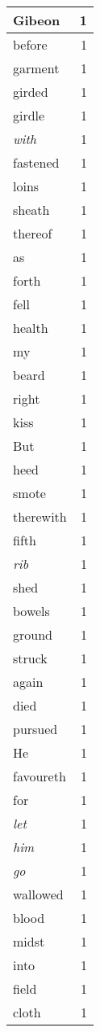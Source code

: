 \begin{center}
\begin{longtable}{l|r}
Gibeon & 1 \\ \hline
before & 1 \\ \hline
garment & 1 \\ \hline
girded & 1 \\ \hline
girdle & 1 \\ \hline
\emph{with} & 1 \\ \hline
fastened & 1 \\ \hline
loins & 1 \\ \hline
sheath & 1 \\ \hline
thereof & 1 \\ \hline
as & 1 \\ \hline
forth & 1 \\ \hline
fell & 1 \\ \hline
health & 1 \\ \hline
my & 1 \\ \hline
beard & 1 \\ \hline
right & 1 \\ \hline
kiss & 1 \\ \hline
But & 1 \\ \hline
heed & 1 \\ \hline
smote & 1 \\ \hline
therewith & 1 \\ \hline
fifth & 1 \\ \hline
\emph{rib} & 1 \\ \hline
shed & 1 \\ \hline
bowels & 1 \\ \hline
ground & 1 \\ \hline
struck & 1 \\ \hline
again & 1 \\ \hline
died & 1 \\ \hline
pursued & 1 \\ \hline
He & 1 \\ \hline
favoureth & 1 \\ \hline
for & 1 \\ \hline
\emph{let} & 1 \\ \hline
\emph{him} & 1 \\ \hline
\emph{go} & 1 \\ \hline
wallowed & 1 \\ \hline
blood & 1 \\ \hline
midst & 1 \\ \hline
into & 1 \\ \hline
field & 1 \\ \hline
cloth & 1 \\ \hline

\end{longtable}
\end{center}
